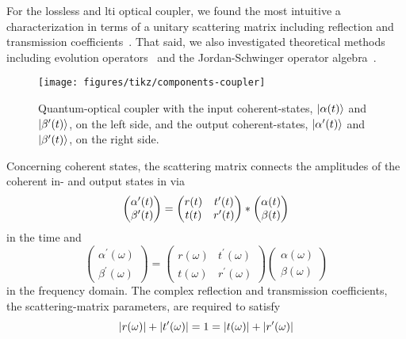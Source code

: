 For the lossless and \gls{lti} optical coupler, we found the most intuitive a characterization in terms of a unitary scattering matrix including reflection and transmission coefficients~\cite{Vogel2006}.
That said, we also investigated theoretical methods including evolution operators~\cite{Haroche2006} and the Jordan-Schwinger operator algebra~\cite{Leonhardt2003}.
\begin{figure}[htb]
    \centering
    \texttt{[image: figures/tikz/components-coupler]}
    \caption{Quantum-optical coupler with the input coherent-states, $\lvert\alpha(t)\rangle$ and $\lvert\beta^\prime(t)\rangle$, on the left side, and the output coherent-states, $\lvert\alpha^\prime(t)\rangle$ and $\lvert\beta^\prime(t)\rangle$, on the right side.}\label{fig:components_two_port}
\end{figure}
Concerning coherent states, the scattering matrix connects the amplitudes of the coherent in- and output states in  via
\begin{equation}
	\begin{pmatrix}
		\alpha^\prime(t)
		\\
		\beta^\prime(t)
	\end{pmatrix}
	=
	\begin{pmatrix}
		r(t) & t^\prime(t) \\
		t(t) & r^\prime(t)
	\end{pmatrix}
	\ast
	\begin{pmatrix}
		\alpha(t)
		\\
		\beta(t)
	\end{pmatrix}	
\end{equation}
in the time and
\begin{equation}
	\begin{pmatrix}
		\alpha^\prime(\omega)
		\\
		\beta^\prime(\omega)
	\end{pmatrix}
	=
	\begin{pmatrix}
		r(\omega) & t^\prime(\omega) \\
		t(\omega) & r^\prime(\omega)
	\end{pmatrix}
	\begin{pmatrix}
		\alpha(\omega)
		\\
		\beta(\omega)
	\end{pmatrix}	
\end{equation}
in the frequency domain.
The complex reflection and transmission coefficients, the scattering-matrix parameters, are required to satisfy
\begin{equation}
	\lvert r(\omega)\rvert
	+
	\lvert t^\prime(\omega)\rvert
	=
	1
	=
	\lvert t(\omega)\rvert
	+
	\lvert r^\prime(\omega)\rvert
\end{equation}
